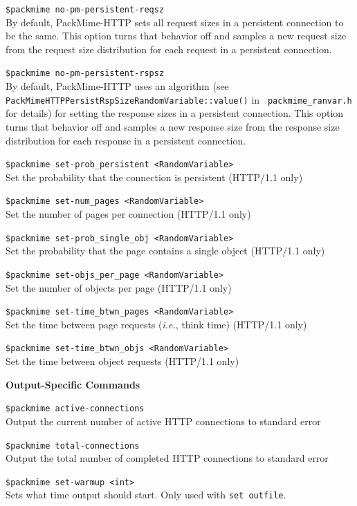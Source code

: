 {\tt \$packmime no-pm-persistent-reqsz}\\
By default, PackMime-HTTP sets all request sizes in a persistent
connection to be the same. This option turns that behavior off and
samples a new request size from the request size distribution for each
request in a persistent connection.

{\tt \$packmime no-pm-persistent-rspsz}\\
By default, PackMime-HTTP uses an algorithm (see {\tt
  PackMimeHTTPPersistRspSizeRandomVariable::value()} in {\tt
  packmime\_ranvar.h} for details) for setting the response sizes in a
persistent connection.  This option turns that behavior off and
samples a new response size from the response size distribution for
each response in a persistent connection.

{\tt \$packmime set-prob\_persistent <RandomVariable>}\\
Set the probability that the connection is persistent (HTTP/1.1 only)

{\tt \$packmime set-num\_pages <RandomVariable>}\\
Set the number of pages per connection (HTTP/1.1 only)

{\tt \$packmime set-prob\_single\_obj <RandomVariable>}\\
Set the probability that the page contains a single object (HTTP/1.1 only)

{\tt \$packmime set-objs\_per\_page <RandomVariable>}\\
Set the number of objects per page (HTTP/1.1 only)

{\tt \$packmime set-time\_btwn\_pages <RandomVariable>}\\
Set the time between page requests (\emph{i.e.}, think time) (HTTP/1.1 only)

{\tt \$packmime set-time\_btwn\_objs <RandomVariable>}\\
Set the time between object requests (HTTP/1.1 only)

{\bf Output-Specific Commands}

{\tt \$packmime active-connections}\\
Output the current number of active HTTP connections to standard error 

{\tt \$packmime total-connections}\\
Output the total number of completed HTTP connections to standard error

{\tt \$packmime set-warmup <int>}\\
Sets what time output should start.  Only used with {\tt set outfile}.

